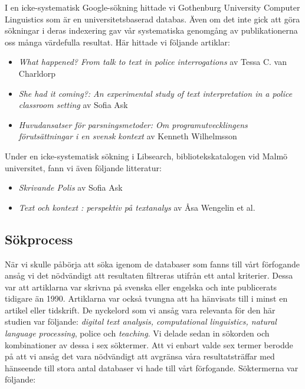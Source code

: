 \documentclass[swedish]{maucsthesis}
\begin{document}
I en icke-systematisk Google-sökning hittade vi Gothenburg University Computer
Linguistics som är en universitetsbaserad databas. Även om det inte gick att
göra sökningar i deras indexering gav vår systematiska genomgång av
publikationerna oss många värdefulla resultat. Här hittade vi följande artiklar:

\begin{itemize}
\item \textit{What happened? From talk to text in police interrogations} av
  Tessa C. van Charldorp
\item \textit{She had it coming?: An experimental study of text interpretation
    in a police classroom setting} av Sofia Ask
\item \textit{Huvudansatser för parsningsmetoder: Om programutvecklingens
    förutsättningar i en svensk kontext} av Kenneth Wilhelmsson
\end{itemize}

Under en icke-systematisk sökning i Libsearch, bibliotekskatalogen vid Malmö
universitet, fann vi även följande litteratur:

\begin{itemize}
\item \textit{Skrivande Polis} av Sofia Ask
\item \textit{Text och kontext : perspektiv på textanalys} av Åsa Wengelin et al.
\end{itemize}

\subsection{Sökprocess}

När vi skulle påbörja att söka igenom de databaser som fanns till vårt förfogande ansåg vi
det nödvändigt att resultaten filtreras utifrån ett antal kriterier. Dessa var
att artiklarna var skrivna på svenska eller engelska och inte publicerats
tidigare än 1990. Artiklarna var också tvungna att ha hänvisats till i minst en
artikel eller tidskrift. De nyckelord som vi ansåg vara relevanta för den här
studien var följande: \textit {digital text analysis, computational linguistics, natural
language processing}, {police} och \textit {teaching}. Vi delade sedan in sökorden och kombinationer av
dessa i sex söktermer. Att vi enbart valde sex termer berodde på att vi ansåg det vara nödvändigt att avgränsa våra resultatsträffar med hänseende till stora antal
databaser vi hade till vårt förfogande.  Söktermerna var följande:
\end{document}
